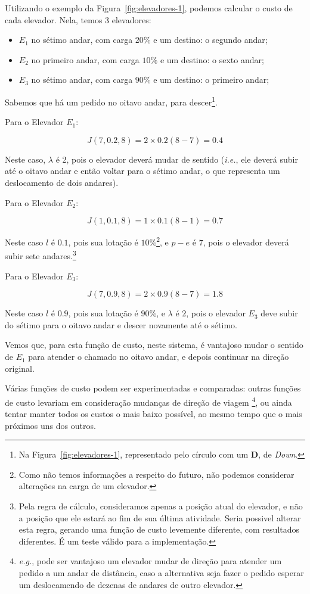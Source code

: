 Utilizando o exemplo da Figura~\ref{fig:elevadores-1}, podemos calcular o custo
de cada elevador. Nela, temos 3 elevadores:

\begin{itemize}
\item \textbf{$E_{1}$} no sétimo andar, com carga $20\%$ e um destino: o segundo andar;
\item \textbf{$E_{2}$} no primeiro andar, com carga $10\%$ e um destino: o sexto andar;
\item \textbf{$E_{3}$} no sétimo andar, com carga $90\%$ e um destino: o primeiro andar;
\end{itemize}

Sabemos que há um pedido no oitavo andar, para descer\footnote{Na
  Figura~\ref{fig:elevadores-1}, representado pelo círculo com um \textbf{D}, de
\textit{Down}.}.

Para o Elevador $E_{1}$:

\[J(7, 0.2, 8) = 2 \times 0.2(8 - 7) = 0.4\]

Neste caso, $\lambda$ é 2, pois o elevador deverá mudar de sentido
(\textit{i.e.}, ele deverá subir até o oitavo andar e então voltar para o sétimo
andar, o que representa um deslocamento de dois andares).

Para o Elevador $E_{2}$:

\[J(1, 0.1, 8) = 1 \times 0.1(8 - 1) = 0.7\]

Neste caso $l$ é $0.1$, pois sua lotação é $10\%$\footnote{Como não temos informações a
respeito do futuro, não podemos considerar alterações na carga de um elevador.},
e $p - e$ é $7$, pois o elevador deverá subir sete andares.\footnote{Pela regra
de cálculo, consideramos apenas a posição atual do elevador, e não a posição que
ele estará ao fim de sua última atividade. Seria possivel alterar esta regra,
gerando uma função de custo levemente diferente, com resultados diferentes. É um
teste válido para a implementação.}

Para o Elevador $E_{3}$:

\[J(7, 0.9, 8) = 2 \times 0.9(8 - 7) = 1.8\]

Neste caso $l$ é $0.9$, pois sua lotação é $90\%$, e $\lambda$ é $2$, pois o elevador
$E_{3}$ deve subir do sétimo para o oitavo andar e descer novamente até o sétimo.

Vemos que, para esta função de custo, neste sistema, é vantajoso mudar o sentido
de $E_{1}$ para atender o chamado no oitavo andar, e depois continuar na direção original.

Várias funções de custo podem ser experimentadas e comparadas: outras funções de
custo levariam em consideração mudanças de direção de viagem
\footnote{\textit{e.g.}, pode ser vantajoso um elevador mudar de direção para
  atender um pedido a um andar de distância, caso a alternativa seja fazer o
  pedido esperar um deslocamendo de dezenas de andares de outro elevador.}, ou
ainda tentar manter todos os custos o mais baixo possível, ao mesmo tempo que o
mais próximos uns dos outros.

